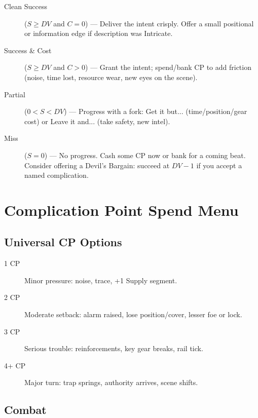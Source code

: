 \begin{description}
\item[Clean Success] ($S \geq DV$ and $C = 0$) --- Deliver the intent crisply. Offer a small positional or information edge if description was Intricate.
\item[Success \& Cost] ($S \geq DV$ and $C > 0$) --- Grant the intent; spend/bank CP to add friction (noise, time lost, resource wear, new eyes on the scene).
\item[Partial] ($0 < S < DV$) --- Progress with a fork: Get it but... (time/position/gear cost) or Leave it and... (take safety, new intel).
\item[Miss] ($S = 0$) --- No progress. Cash some CP now or bank for a coming beat. Consider offering a Devil's Bargain: succeed at $DV-1$ if you accept a named complication.
\end{description}

\section{Complication Point Spend Menu}

\subsection{Universal CP Options}

\begin{description}
\item[1 CP] Minor pressure: noise, trace, +1 Supply segment.
\item[2 CP] Moderate setback: alarm raised, lose position/cover, lesser foe or lock.
\item[3 CP] Serious trouble: reinforcements, key gear breaks, rail tick.
\item[4+ CP] Major turn: trap springs, authority arrives, scene shifts.
\end{description}

\subsection{Combat}

